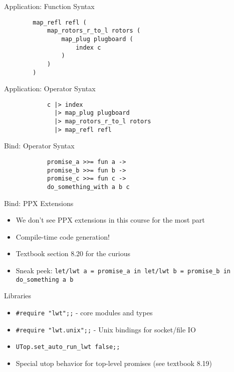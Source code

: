 \documentclass{beamer}
\newcommand{\code}[1]{\texttt{#1}}
\begin{document}
    \begin{frame}[fragile=singleslide]{Application: Function Syntax}
        \begin{verbatim}
        map_refl refl (
            map_rotors_r_to_l rotors (
                map_plug plugboard (
                    index c
                )
            )
        )
        \end{verbatim}
    \end{frame}

    \begin{frame}[fragile=singleslide]{Application: Operator Syntax}
        \begin{verbatim}
            c |> index
              |> map_plug plugboard
              |> map_rotors_r_to_l rotors
              |> map_refl refl
        \end{verbatim}
    \end{frame}

    \begin{frame}[fragile=singleslide]{Bind: Operator Syntax}
        \begin{verbatim}
            promise_a >>= fun a ->
            promise_b >>= fun b ->
            promise_c >>= fun c ->
            do_something_with a b c
        \end{verbatim}
    \end{frame}

    \begin{frame}{Bind: PPX Extensions}
        \begin{itemize}
            \item<1-> We don't see PPX extensions in this course for the most part
            \item<2-> Compile-time code generation!
            \item<3-> Textbook section 8.20 for the curious
            \item<4-> Sneak peek: \code{let/lwt a = promise_a in let/lwt b = promise_b in do_something a b}
        \end{itemize}
    \end{frame}

    \begin{frame}{Libraries}
        \begin{itemize}
            \item<1-> \code{#require "lwt";;} - core modules and types
            \item<2-> \code{#require "lwt.unix";;} - Unix bindings for socket/file IO
            \item<3-> \code{UTop.set_auto_run_lwt false;;}
            \item<3-> Special utop behavior for top-level promises (see textbook 8.19)
        \end{itemize}
    \end{frame}
\end{document}
